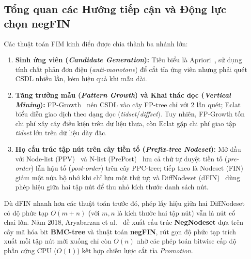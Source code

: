 \documentclass[conference]{IEEEtran}
\begin{document}
\subsection{Tổng quan các Hướng tiếp cận và Động lực chọn negFIN}
Các thuật toán FIM kinh điển được chia thành ba nhánh lớn:
\begin{enumerate}
    \item \textbf{Sinh ứng viên (\textit{Candidate Generation}):} Tiêu biểu là Apriori~\cite{b2}, sử dụng tính chất phản đơn điệu (\textit{anti-monotone}) để cắt tỉa ứng viên nhưng phải quét CSDL nhiều lần, kém hiệu quả khi mẫu dài.
    \item \textbf{Tăng trưởng mẫu (\textit{Pattern Growth}) và Khai thác dọc (\textit{Vertical Mining}):} FP-Growth~\cite{b3} nén CSDL vào cây FP-tree chỉ với 2 lần quét; Eclat~\cite{b4} biểu diễn giao dịch theo dạng dọc (\textit{tidset}/\textit{diffset}). Tuy nhiên, FP-Growth tốn chi phí xây cây điều kiện trên dữ liệu thưa, còn Eclat gặp chi phí giao tập \textit{tidset} lớn trên dữ liệu dày đặc.
    \item \textbf{Họ cấu trúc tập nút trên cây tiền tố (\textit{Prefix-tree Nodeset}):} Mở đầu với Node-list (PPV)~\cite{b5} và N-list (PrePost)~\cite{b6} lưu cả thứ tự duyệt tiền tố (\textit{pre-order}) lẫn hậu tố (\textit{post-order}) trên cây PPC-tree; tiếp theo là Nodeset (FIN)~\cite{b7} giảm một nửa bộ nhớ khi chỉ lưu một thứ tự; và DiffNodeset (dFIN)~\cite{b8} dùng phép hiệu giữa hai tập nút để thu nhỏ kích thước danh sách nút.
\end{enumerate}

Dù dFIN nhanh hơn các thuật toán trước đó, phép lấy hiệu giữa hai DiffNodeset có độ phức tạp $O(m + n)$ (với $m, n$ là kích thước hai tập nút) vẫn là nút cổ chai lớn. Năm 2018, Aryabarzan et al.~\cite{b9} đề xuất cấu trúc \textbf{NegNodeset} dựa trên cây mã hóa bit \textbf{BMC-tree} và thuật toán \textbf{negFIN}, rút gọn độ phức tạp trích xuất mỗi tập nút mới xuống chỉ còn $O(n)$ nhờ các phép toán bitwise cấp độ phần cứng CPU ($O(1)$) kết hợp chiến lược cắt tỉa \textit{Promotion}.
\end{document}
